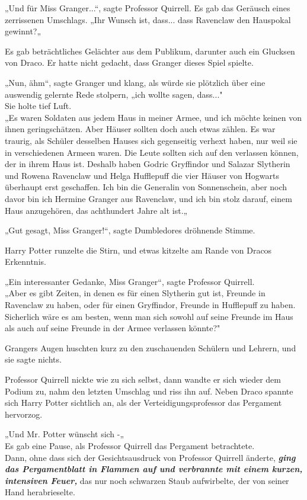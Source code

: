 {„Und für Miss Granger...“, sagte Professor Quirrell. Es gab das Geräusch eines zerrissenen Umschlags. „Ihr Wunsch ist, dass... dass Ravenclaw den Hauspokal gewinnt?„

Es gab beträchtliches Gelächter aus dem Publikum, darunter auch ein Glucksen von Draco. Er hatte nicht gedacht, dass Granger dieses Spiel spielte.

„Nun, ähm“, sagte Granger und klang, als würde sie plötzlich über eine auswendig gelernte Rede stolpern, „ich wollte sagen, dass..."\\ Sie holte tief Luft.\\ „Es waren Soldaten aus jedem Haus in meiner Armee, und ich möchte keinen von ihnen geringschätzen. Aber Häuser sollten doch auch etwas zählen. Es war traurig, als Schüler desselben Hauses sich gegenseitig verhext haben, nur weil sie in verschiedenen Armeen waren. Die Leute sollten sich auf den verlassen können, der in ihrem Haus ist. Deshalb haben Godric Gryffindor und Salazar Slytherin und Rowena Ravenclaw und Helga Hufflepuff die vier Häuser von Hogwarts überhaupt erst geschaffen. Ich bin die Generalin von Sonnenschein, aber noch davor bin ich Hermine Granger aus Ravenclaw, und ich bin stolz darauf, einem Haus anzugehören, das achthundert Jahre alt ist.„

„Gut gesagt, Miss Granger!“, sagte Dumbledores dröhnende Stimme.

Harry Potter runzelte die Stirn, und etwas kitzelte am Rande von Dracos Erkenntnis.

„Ein interessanter Gedanke, Miss Granger“, sagte Professor Quirrell.\\ „Aber es gibt Zeiten, in denen es für einen Slytherin gut ist, Freunde in Ravenclaw zu haben, oder für einen Gryffindor, Freunde in Hufflepuff zu haben. Sicherlich wäre es am besten, wenn man sich sowohl auf seine Freunde im Haus als auch auf seine Freunde in der Armee verlassen könnte?"

Grangers Augen huschten kurz zu den zuschauenden Schülern und Lehrern, und sie sagte nichts.

Professor Quirrell nickte wie zu sich selbst, dann wandte er sich wieder dem Podium zu, nahm den letzten Umschlag und riss ihn auf. Neben Draco spannte sich Harry Potter sichtlich an, als der Verteidigungsprofessor das Pergament hervorzog.

„Und Mr. Potter wünscht sich -„\\ Es gab eine Pause, als Professor Quirrell das Pergament betrachtete.\\ Dann, ohne dass sich der Gesichtsausdruck von Professor Quirrell änderte, \textbf{\emph{ging das Pergamentblatt in Flammen auf und verbrannte mit einem kurzen, intensiven Feuer,}} das nur noch schwarzen Staub aufwirbelte, der von seiner Hand herabrieselte.

}
